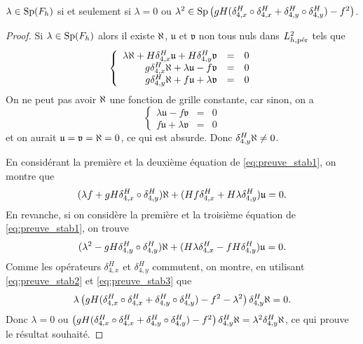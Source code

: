 \begin{proposition}
$\lambda \in \Sp(F_h)$ si et seulement si $\lambda = 0$ ou $\lambda^2 \in \Sp \left( gH (\delta_{4,x}^H \circ \delta_{4,x}^H + \delta_{4,y}^H \circ \delta_{4,y}^H) - f^2 \right)$.
\label{prop:spectre_F_h}
\end{proposition}

\begin{proof}
Si $\lambda \in \Sp(F_h)$ alors il existe $\etafrak$, $\mathfrak{u}$ et $\mathfrak{v}$ non tous nuls dans $L^2_{h,\per}$ tels que
\begin{equation}
\left\lbrace
\begin{array}{rcl}
\lambda \etafrak + H \delta_{4,x}^H \mathfrak{u} + H \delta_{4,y}^H \mathfrak{v} & = & 0 \\
g \delta_{4,x}^H \etafrak + \lambda \mathfrak{u} - f \mathfrak{v} & = & 0 \\
g \delta_{4,y}^H \etafrak + f \mathfrak{u} + \lambda \mathfrak{v} & = & 0
\end{array}
\right.
\label{eq:preuve_stab1}
\end{equation}
On ne peut pas avoir $\etafrak$ une fonction de grille constante, car sinon, on a 
\begin{equation}
\left\lbrace
\begin{array}{rcl}
\lambda \mathfrak{u} - f \mathfrak{v} & = & 0 \\
f \mathfrak{u} + \lambda \mathfrak{v} & = & 0
\end{array}
\right.
\end{equation}
et on aurait $\mathfrak{u} = \mathfrak{v} = \etafrak = 0$, ce qui est absurde. Donc $\delta_{4,y}^H \etafrak \neq 0$.

En considérant la première et la deuxième équation de \eqref{eq:preuve_stab1}, on montre que 
\begin{equation}
(\lambda f + gH \delta_{4,x}^H \circ \delta_{4,y}^H) \etafrak + (Hf \delta_{4,x}^H + H \lambda \delta_{4,y}^H) \mathfrak{u} = 0.
\label{eq:preuve_stab2}
\end{equation}
En revanche, si on considère la première et la troisième équation de \eqref{eq:preuve_stab1}, on trouve
\begin{equation}
(\lambda^2 - gH \delta_{4,y}^H \circ \delta_{4,y}^H) \etafrak + (H \lambda \delta_{4,x}^H - f H \delta_{4,y}^H) \mathfrak{u} = 0.
\label{eq:preuve_stab3}
\end{equation}
Comme les opérateurs $\delta_{4,x}^H$ et $\delta_{4,y}^H$ commutent, on montre, en utilisant \eqref{eq:preuve_stab2} et \eqref{eq:preuve_stab3} que
\begin{equation}
\lambda \left( gH (\delta_{4,x}^H \circ \delta_{4,x}^H + \delta_{4,y}^H \circ \delta_{4,y}^H) - f^2 - \lambda^2 \right) \delta_{4,y}^H \etafrak = 0.
\end{equation}
Donc $\lambda = 0$ ou $\left( gH (\delta_{4,x}^H \circ \delta_{4,x}^H + \delta_{4,y}^H \circ \delta_{4,y}^H) - f^2\right) \delta_{4,y}^H \etafrak = \lambda^2 \delta_{4,y}^H \etafrak$,
ce qui prouve le résultat souhaité.
\end{proof}

